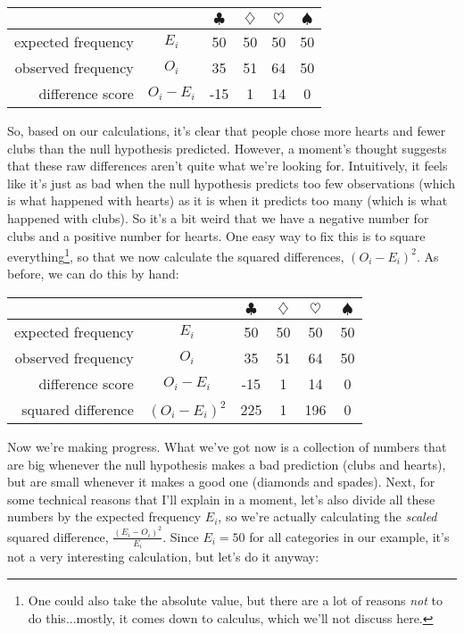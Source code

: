 \begin{center}
\begin{tabular}{rc|cccc}
& & $\clubsuit$ & $\diamondsuit$ & $\heartsuit$ & $\spadesuit$ \\ \hline 
expected frequency &$E_i$ & 50 & 50 & 50 & 50 \\ 
observed frequency &$O_i$ & 35 & 51 & 64 & 50 \\ 
difference score & $O_i - E_i$ & -15 & 1 & 14 & 0 \\
\end{tabular}
\end{center}

So, based on our calculations, it's clear that people chose more hearts and fewer clubs than the null hypothesis predicted. However, a moment's thought suggests that these raw differences aren't quite what we're looking for. Intuitively, it feels like it's just as bad when the null hypothesis predicts too few observations (which is what happened with hearts) as it is when it predicts too many (which is what happened with clubs). So it's a bit weird that we have a negative number for clubs and a positive number for hearts. One easy way to fix this is to square everything\footnote{One could also take the absolute value, but there are a lot of reasons \textit{not} to do this...mostly, it comes down to calculus, which we'll not discuss here.}, so that we now calculate the squared differences, $(O_i - E_i)^2$. As before, we can do this by hand: 

\begin{center}
\begin{tabular}{rc|cccc}
& & $\clubsuit$ & $\diamondsuit$ & $\heartsuit$ & $\spadesuit$ \\ \hline 
expected frequency &$E_i$ & 50 & 50 & 50 & 50 \\ 
observed frequency &$O_i$ & 35 & 51 & 64 & 50 \\ 
  difference score & $O_i - E_i$ & -15 & 1 & 14 & 0 \\
  squared difference & $(O_i-E_i)^2$ & 225 & 1 & 196 & 0\\
\end{tabular}
\end{center}

Now we're making progress. What we've got now is a collection of numbers that are big whenever the null hypothesis makes a bad prediction (clubs and hearts), but are small whenever it makes a good one (diamonds and spades). Next, for some technical reasons that I'll explain in a moment, let's also divide all these numbers by the expected frequency $E_i$, so we're actually calculating the \emph{scaled} squared difference, $\frac{(E_i-O_i)^2}{E_i}$. Since $E_i = 50$ for all categories in our example, it's not a very interesting calculation, but let's do it anyway:

